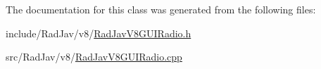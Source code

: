 The documentation for this class was generated from the following files\+:\begin{DoxyCompactItemize}
\item 
include/\+Rad\+Jav/v8/\mbox{\hyperlink{_rad_jav_v8_g_u_i_radio_8h}{Rad\+Jav\+V8\+G\+U\+I\+Radio.\+h}}\item 
src/\+Rad\+Jav/v8/\mbox{\hyperlink{_rad_jav_v8_g_u_i_radio_8cpp}{Rad\+Jav\+V8\+G\+U\+I\+Radio.\+cpp}}\end{DoxyCompactItemize}
